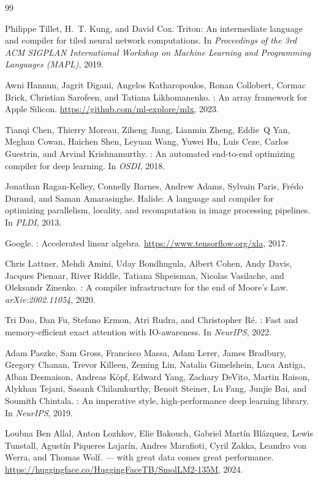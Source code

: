 \documentclass[10pt,twocolumn]{article}
\begin{document}
\begin{thebibliography}{99}

Philippe Tillet, H.~T. Kung, and David Cox.
\newblock Triton: An intermediate language and compiler for tiled neural
network computations.
\newblock In \emph{Proceedings of the 3rd ACM SIGPLAN International Workshop
on Machine Learning and Programming Languages (MAPL)}, 2019.

Awni Hannun, Jagrit Digani, Angelos Katharopoulos, Ronan Collobert,
Cormac Brick, Christian Sarofeen, and Tatiana Likhomanenko.
: An array framework for Apple Silicon.
\newblock \url{https://github.com/ml-explore/mlx}, 2023.

Tianqi Chen, Thierry Moreau, Ziheng Jiang, Lianmin Zheng, Eddie~Q Yan,
Meghan Cowan, Haichen Shen, Leyuan Wang, Yuwei Hu, Luis Ceze, Carlos Guestrin,
and Arvind Krishnamurthy.
: An automated end-to-end optimizing compiler for deep learning.
\newblock In \emph{OSDI}, 2018.

Jonathan Ragan-Kelley, Connelly Barnes, Andrew Adams, Sylvain Paris,
Fr\'{e}do Durand, and Saman Amarasinghe.
\newblock Halide: A language and compiler for optimizing parallelism,
locality, and recomputation in image processing pipelines.
\newblock In \emph{PLDI}, 2013.

Google.
: Accelerated linear algebra.
\newblock \url{https://www.tensorflow.org/xla}, 2017.

Chris Lattner, Mehdi Amini, Uday Bondhugula, Albert Cohen, Andy Davis,
Jacques Pienaar, River Riddle, Tatiana Shpeisman, Nicolas Vasilache, and
Oleksandr Zinenko.
: A compiler infrastructure for the end of Moore's Law.
\newblock \emph{arXiv:2002.11054}, 2020.

Tri Dao, Dan Fu, Stefano Ermon, Atri Rudra, and Christopher R\'{e}.
: Fast and memory-efficient exact attention with
IO-awareness.
\newblock In \emph{NeurIPS}, 2022.

Adam Paszke, Sam Gross, Francisco Massa, Adam Lerer, James Bradbury,
Gregory Chanan, Trevor Killeen, Zeming Lin, Natalia Gimelshein, Luca Antiga,
Alban Desmaison, Andreas K\"{o}pf, Edward Yang, Zachary DeVito, Martin Raison,
Alykhan Tejani, Sasank Chilamkurthy, Benoit Steiner, Lu Fang, Junjie Bai,
and Soumith Chintala.
: An imperative style, high-performance deep learning library.
\newblock In \emph{NeurIPS}, 2019.

Loubna Ben Allal, Anton Lozhkov, Elie Bakouch, Gabriel Mart\'{i}n Bl\'{a}zquez,
Lewis Tunstall, Agust\'{i}n Piqueres Lajar\'{i}n, Andres Marafioti,
Cyril Zakka, Leandro von Werra, and Thomas Wolf.
 --- with great data comes great performance.
\newblock \url{https://huggingface.co/HuggingFaceTB/SmolLM2-135M}, 2024.

\end{thebibliography}
\end{document}
